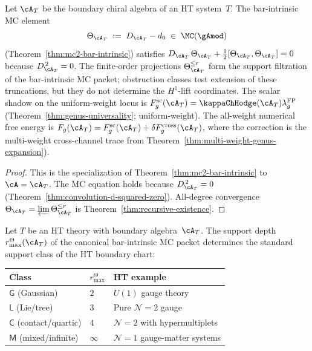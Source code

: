 \begin{theorem}
\label{thm:ht-mc-all-genera}
Let $\cA_T$ be the boundary chiral algebra of an HT system~$T$.
The bar-intrinsic MC element
\begin{equation}\label{eq:ht-theta}
\Theta_{\cA_T}
\;:=\; D_{\cA_T} - d_0
\;\in\; \MC(\gAmod)
\end{equation}
\textup{(}Theorem~\textup{\ref{thm:mc2-bar-intrinsic}}\textup{)}
satisfies
$D_{\cA_T}\,\Theta_{\cA_T}
+ \tfrac{1}{2}[\Theta_{\cA_T},\Theta_{\cA_T}] = 0$
because $D_{\cA_T}^{\,2} = 0$. The finite-order projections
\(\Theta_{\cA_T}^{\le r}\) form the support filtration of the
bar-intrinsic MC packet; obstruction classes test extension of these
truncations, but they do not determine the \(H^1\)-lift coordinates.
The scalar shadow on the uniform-weight locus is
$F_g^{\mathrm{sc}}(\cA_T)
=\kappaChHodge(\cA_T)\lambda_g^{\mathrm{FP}}$
\textup{(}Theorem~\textup{\ref{thm:genus-universality}};
uniform-weight\textup{)}.  The all-weight numerical free energy is
$F_g(\cA_T)=F_g^{\mathrm{sc}}(\cA_T)
+\delta F_g^{\mathrm{cross}}(\cA_T)$,
where the correction is the multi-weight cross-channel trace from
Theorem~\textup{\ref{thm:multi-weight-genus-expansion}}\textup{)}.
\end{theorem}

\begin{proof}
This is the specialization of
Theorem~\ref{thm:mc2-bar-intrinsic} to $\cA = \cA_T$. The MC
equation holds because $D_{\cA_T}^{\,2} = 0$
(Theorem~\ref{thm:convolution-d-squared-zero}). All-degree
convergence $\Theta_{\cA_T} = \varprojlim \Theta_{\cA_T}^{\leq r}$
is Theorem~\ref{thm:recursive-existence}.
\end{proof}

\begin{corollary}
\label{cor:ht-shadow-archetype}
Let $T$ be an HT theory with boundary algebra~$\cA_T$. The support
depth \(r^\Theta_{\max}(\cA_T)\) of the canonical
bar-intrinsic MC packet determines the standard support class of the
HT boundary chart:
\begin{center}
\renewcommand{\arraystretch}{1.2}
\begin{tabular}{lll}
\toprule
\textbf{Class} & \(r^\Theta_{\max}\) & \textbf{HT example} \\
\midrule
$\mathsf{G}$ (Gaussian) & $2$ & $U(1)$ gauge theory \\
$\mathsf{L}$ (Lie/tree) & $3$ & Pure $\mathcal{N}=2$ gauge \\
$\mathsf{C}$ (contact/quartic) & $4$ &
 $\mathcal{N}=2$ with hypermultiplets \\
$\mathsf{M}$ (mixed/infinite) & $\infty$ &
 $\mathcal{N}=1$ gauge-matter systems \\
\bottomrule
\end{tabular}
\end{center}
\end{corollary}

